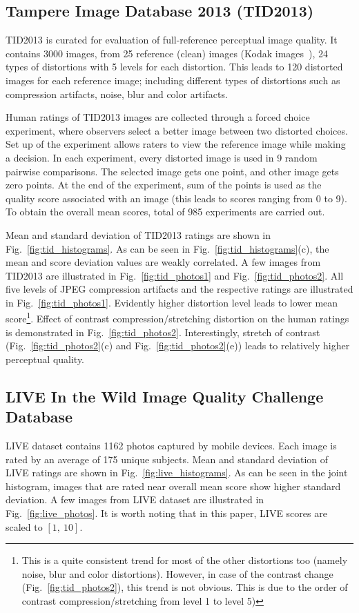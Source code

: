 \documentclass[10pt,twocolumn,twoside]{IEEEtran}
\begin{document}
 \subsection{Tampere Image Database 2013 (TID2013) \cite{ponomarenko2013color}}
TID2013 is curated for evaluation of full-reference perceptual image quality. It contains 3000 images, from 25 reference (clean) images (Kodak images~\cite{kodak_dataset}), 24 types of distortions with 5 levels for each distortion. This leads to 120 distorted images for each reference image; including different types of distortions such as compression artifacts, noise, blur and color artifacts. 

Human ratings of TID2013 images are collected through a forced choice experiment, where observers select a better image between two distorted choices. Set up of the experiment allows raters to view the reference image while making a decision. In each experiment, every distorted image is used in 9 random pairwise comparisons. The selected image gets one point, and other image gets zero points. At the end of the experiment, sum of the points is used as the quality score associated with an image (this leads to scores ranging from 0 to 9). To obtain the overall mean scores, total of 985 experiments are carried out.

Mean and standard deviation of TID2013 ratings are shown in Fig.~\ref{fig:tid_histograms}. As can be seen in Fig.~\ref{fig:tid_histograms}(c), the mean and score deviation values are weakly correlated. A few images from TID2013 are illustrated in Fig.~\ref{fig:tid_photos1} and Fig.~\ref{fig:tid_photos2}. All five levels of JPEG compression artifacts and the respective ratings are illustrated in Fig.~\ref{fig:tid_photos1}. Evidently higher distortion level leads to lower mean score\footnote{This is a quite consistent trend for most of the other distortions too (namely noise, blur and color distortions). However, in case of the contrast change (Fig.~\ref{fig:tid_photos2}), this trend is not obvious. This is due to the order of contrast compression/stretching from level 1 to level 5)}. Effect of contrast compression/stretching distortion on the human ratings is demonstrated in Fig.~\ref{fig:tid_photos2}. Interestingly, stretch of contrast (Fig.~\ref{fig:tid_photos2}(c) and Fig.~\ref{fig:tid_photos2}(e)) leads to relatively higher perceptual quality.

 \subsection{LIVE In the Wild Image Quality Challenge Database \cite{ghadiyaram2016massive}}
LIVE dataset contains 1162 photos captured by mobile devices. Each image is rated by an average of 175 unique subjects. Mean and standard deviation of LIVE ratings are shown in Fig.~\ref{fig:live_histograms}. As can be seen in the joint histogram, images that are rated near overall mean score show higher standard deviation.  A few images from LIVE dataset are illustrated in Fig.~\ref{fig:live_photos}. It is worth noting that in this paper, LIVE scores are scaled to $[1,\:10]$.
\end{document}
